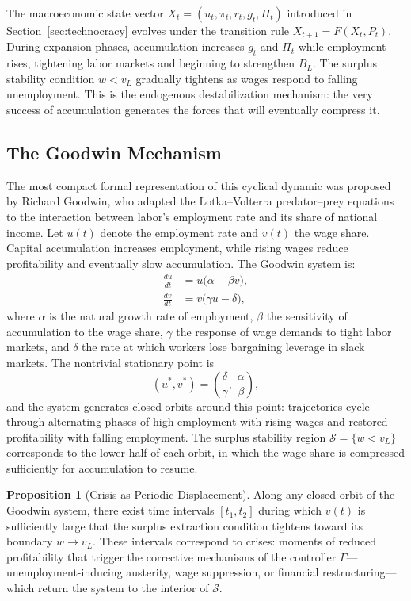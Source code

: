 \documentclass[12pt,a4paper]{article}
\theoremstyle{definition}
\newtheorem{proposition}{Proposition}[section]
\theoremstyle{remark}
\begin{document}
The macroeconomic state vector $X_t = (u_t, \pi_t, r_t, g_t, \Pi_t)$ introduced in Section~\ref{sec:technocracy} evolves under the transition rule $X_{t+1} = F(X_t, P_t)$. During expansion phases, accumulation increases $g_t$ and $\Pi_t$ while employment rises, tightening labor markets and beginning to strengthen $B_L$. The surplus stability condition $w < v_L$ gradually tightens as wages respond to falling unemployment. This is the endogenous destabilization mechanism: the very success of accumulation generates the forces that will eventually compress it.

\subsection{The Goodwin Mechanism}

The most compact formal representation of this cyclical dynamic was proposed by Richard Goodwin, who adapted the Lotka--Volterra predator--prey equations to the interaction between labor's employment rate and its share of national income. Let $u(t)$ denote the employment rate and $v(t)$ the wage share. Capital accumulation increases employment, while rising wages reduce profitability and eventually slow accumulation. The Goodwin system is:
\begin{align}
  \label{eq:goodwin_u}
  \frac{du}{dt} &= u\bigl(\alpha - \beta v\bigr), \\
  \label{eq:goodwin_v}
  \frac{dv}{dt} &= v\bigl(\gamma u - \delta\bigr),
\end{align}
where $\alpha$ is the natural growth rate of employment, $\beta$ the sensitivity of accumulation to the wage share, $\gamma$ the response of wage demands to tight labor markets, and $\delta$ the rate at which workers lose bargaining leverage in slack markets. The nontrivial stationary point is
\begin{equation}
  (u^*, v^*) = \left(\frac{\delta}{\gamma},\; \frac{\alpha}{\beta}\right),
\end{equation}
and the system generates closed orbits around this point: trajectories cycle through alternating phases of high employment with rising wages and restored profitability with falling employment. The surplus stability region $\mathcal{S} = \{w < v_L\}$ corresponds to the lower half of each orbit, in which the wage share is compressed sufficiently for accumulation to resume.

\begin{proposition}[Crisis as Periodic Displacement]
Along any closed orbit of the Goodwin system, there exist time intervals $[t_1, t_2]$ during which $v(t)$ is sufficiently large that the surplus extraction condition tightens toward its boundary $w \to v_L$. These intervals correspond to crises: moments of reduced profitability that trigger the corrective mechanisms of the controller $\Gamma$---unemployment-inducing austerity, wage suppression, or financial restructuring---which return the system to the interior of $\mathcal{S}$.
\end{proposition}
\end{document}
